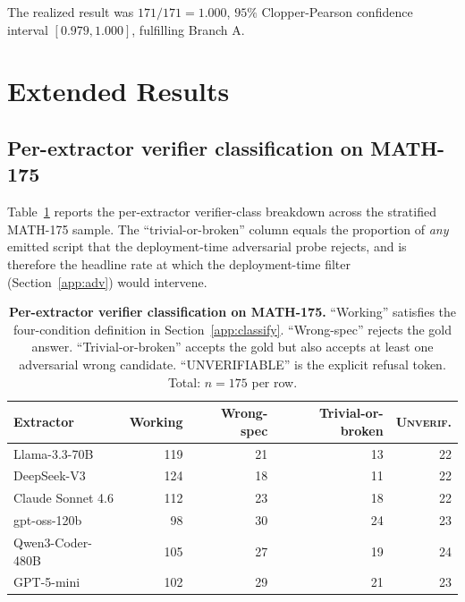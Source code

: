 \documentclass{article}
\begin{document}
The realized result was $171/171 = 1.000$, $95\%$ Clopper-Pearson confidence
interval $[0.979, 1.000]$, fulfilling Branch A.

\section{Extended Results}
\label{app:results}

\subsection{Per-extractor verifier classification on MATH-175}
\label{app:perext}

Table~\ref{tab:perext-app} reports the per-extractor verifier-class
breakdown across the stratified MATH-175 sample. The
``trivial-or-broken'' column equals the proportion of \emph{any}
emitted script that the deployment-time adversarial probe rejects, and
is therefore the headline rate at which the deployment-time filter
(Section~\ref{app:adv}) would intervene.

\begin{table}[h]
\centering
\caption{\textbf{Per-extractor verifier classification on MATH-175.}
``Working'' satisfies the four-condition definition in
Section~\ref{app:classify}. ``Wrong-spec'' rejects the gold answer.
``Trivial-or-broken'' accepts the gold but also accepts at least one
adversarial wrong candidate. ``UNVERIFIABLE'' is the explicit refusal
token. Total: $n{=}175$ per row.}
\label{tab:perext-app}
\small
\begin{tabular}{lrrrr}
\toprule
Extractor & Working & Wrong-spec & Trivial-or-broken & \textsc{Unverif.} \\
\midrule
Llama-3.3-70B          & 119 & 21 & 13 & 22 \\
DeepSeek-V3            & 124 & 18 & 11 & 22 \\
Claude Sonnet 4.6      & 112 & 23 & 18 & 22 \\
gpt-oss-120b           &  98 & 30 & 24 & 23 \\
Qwen3-Coder-480B       & 105 & 27 & 19 & 24 \\
GPT-5-mini             & 102 & 29 & 21 & 23 \\
\bottomrule
\end{tabular}
\end{table}
\end{document}
